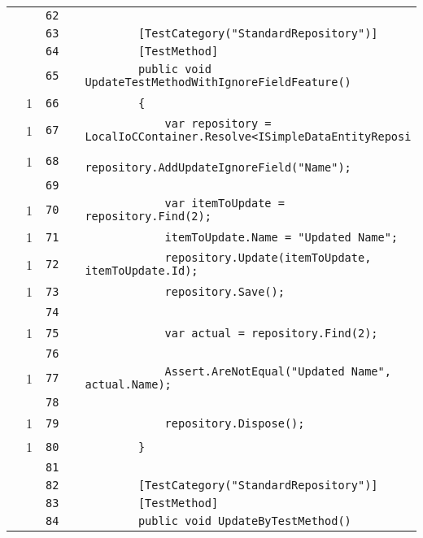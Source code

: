 \documentclass[a4paper,10pt]{article}
\begin{document}
\begin{longtable}[l]{lrrll}
\cellcolor{gray} &  & \verb~62~ & & \verb~~\\
\cellcolor{gray} &  & \verb~63~ & & \verb~        [TestCategory("StandardRepository")]~\\
\cellcolor{gray} &  & \verb~64~ & & \verb~        [TestMethod]~\\
\cellcolor{gray} &  & \verb~65~ & & \verb~        public void UpdateTestMethodWithIgnoreFieldFeature()~\\
\cellcolor{green} & 1 & \verb~66~ & & \verb~        {~\\
\cellcolor{green} & 1 & \verb~67~ & & \verb~            var repository = LocalIoCContainer.Resolve<ISimpleDataEntityReposi~\\
\cellcolor{green} & 1 & \verb~68~ & & \verb~            repository.AddUpdateIgnoreField("Name");~\\
\cellcolor{gray} &  & \verb~69~ & & \verb~~\\
\cellcolor{green} & 1 & \verb~70~ & & \verb~            var itemToUpdate = repository.Find(2);~\\
\cellcolor{green} & 1 & \verb~71~ & & \verb~            itemToUpdate.Name = "Updated Name";~\\
\cellcolor{green} & 1 & \verb~72~ & & \verb~            repository.Update(itemToUpdate, itemToUpdate.Id);~\\
\cellcolor{green} & 1 & \verb~73~ & & \verb~            repository.Save();~\\
\cellcolor{gray} &  & \verb~74~ & & \verb~~\\
\cellcolor{green} & 1 & \verb~75~ & & \verb~            var actual = repository.Find(2);~\\
\cellcolor{gray} &  & \verb~76~ & & \verb~~\\
\cellcolor{green} & 1 & \verb~77~ & & \verb~            Assert.AreNotEqual("Updated Name", actual.Name);~\\
\cellcolor{gray} &  & \verb~78~ & & \verb~~\\
\cellcolor{green} & 1 & \verb~79~ & & \verb~            repository.Dispose();~\\
\cellcolor{green} & 1 & \verb~80~ & & \verb~        }~\\
\cellcolor{gray} &  & \verb~81~ & & \verb~~\\
\cellcolor{gray} &  & \verb~82~ & & \verb~        [TestCategory("StandardRepository")]~\\
\cellcolor{gray} &  & \verb~83~ & & \verb~        [TestMethod]~\\
\cellcolor{gray} &  & \verb~84~ & & \verb~        public void UpdateByTestMethod()~\\

\end{longtable}
\end{document}

